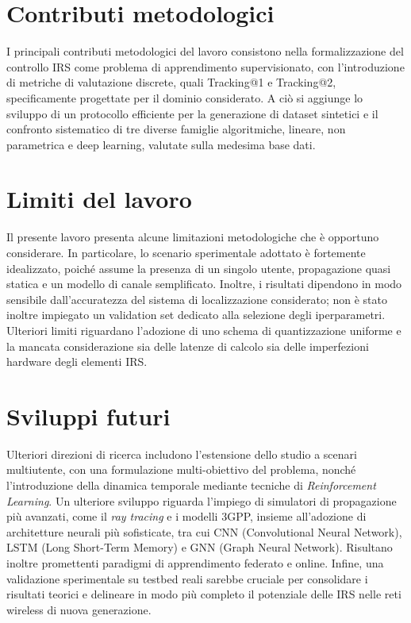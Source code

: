 \documentclass[12pt,a4paper]{report}
\begin{document}
\section{Contributi metodologici}
I principali contributi metodologici del lavoro consistono nella
formalizzazione del controllo IRS come problema di apprendimento
supervisionato, con l'introduzione di metriche di valutazione
discrete, quali Tracking@1 e Tracking@2, specificamente progettate
per il dominio considerato. A ciò si aggiunge lo sviluppo di un
protocollo efficiente per la generazione di dataset sintetici e il
confronto sistematico di tre diverse famiglie algoritmiche, lineare,
non parametrica e deep learning, valutate sulla medesima base dati.

\section{Limiti del lavoro}
Il presente lavoro presenta alcune limitazioni metodologiche che è
opportuno considerare. In particolare, lo scenario sperimentale
adottato è fortemente idealizzato, poiché assume la presenza di un
singolo utente, propagazione quasi statica e un modello di canale
semplificato. Inoltre, i risultati dipendono in modo sensibile
dall'accuratezza del sistema di localizzazione considerato; non è
stato inoltre impiegato un validation set dedicato alla selezione
degli iperparametri. Ulteriori limiti riguardano l'adozione di uno
schema di quantizzazione uniforme e la mancata considerazione sia
delle latenze di calcolo sia delle imperfezioni hardware degli elementi IRS.

\section{Sviluppi futuri}
Ulteriori direzioni di ricerca includono l'estensione dello studio a
scenari multiutente, con una formulazione multi-obiettivo del
problema, nonché l'introduzione della dinamica temporale mediante
tecniche di \textit{Reinforcement Learning}. Un ulteriore sviluppo
riguarda l'impiego di simulatori di propagazione più avanzati, come
il \textit{ray tracing} e i modelli 3GPP, insieme all'adozione di
architetture neurali più sofisticate, tra cui CNN (Convolutional
Neural Network), LSTM (Long Short-Term Memory) e GNN (Graph Neural
Network). Risultano inoltre promettenti paradigmi di apprendimento
federato e online. Infine, una validazione sperimentale su testbed
reali sarebbe cruciale per consolidare i risultati teorici e
delineare in modo più completo il potenziale delle IRS nelle reti
wireless di nuova generazione.
\end{document}

